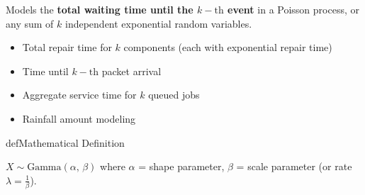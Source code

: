 \begin{Shaded}
\begin{Highlighting}[]
\OperatorTok{;}
\NormalTok{(}\OperatorTok{,} \OperatorTok{,} \OperatorTok{,} \OperatorTok{,} \NormalTok{)}\OperatorTok{;}
 \OperatorTok{;}
\NormalTok{(}\OperatorTok{,} \OperatorTok{,} \OperatorTok{,} \OperatorTok{,} \NormalTok{)}\OperatorTok{;}
\NormalTok{(}\NormalTok{)}\OperatorTok{;} \NormalTok{(}\NormalTok{)}\OperatorTok{;}
\NormalTok{(}\NormalTok{)}\OperatorTok{;}
\NormalTok{(}\OperatorTok{,} \NormalTok{)}\OperatorTok{;}
 \OperatorTok{;}
\end{Highlighting}
\end{Shaded}



Models the \textbf{total waiting time until the $k-\mathrm{th}$ event} in a Poisson process, or any sum of $k$ independent exponential random variables.


\begin{itemize}
\tightlist
\item
  Total repair time for $k$ components (each with exponential repair time)
\item
  Time until $k-\mathrm{th}$ packet arrival
\item
  Aggregate service time for $k$ queued jobs
\item
  Rainfall amount modeling
\end{itemize}

\begin{PSbox}[unbreakable]{def}{Mathematical Definition}

$X \sim \mathrm{Gamma}(\alpha,\, \beta)$ where $\alpha$ = shape parameter, $\beta$ = scale parameter (or rate $\lambda = \frac{1}{\beta}$).

\end{PSbox}

